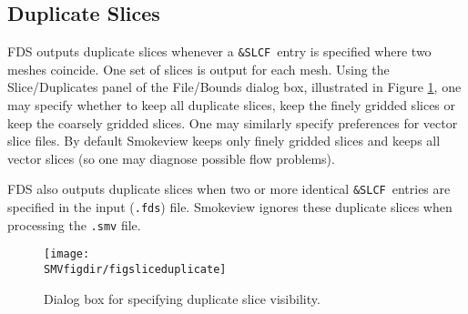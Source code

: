 \documentclass[11pt,twoside]{book}
\begin{document}

\subsection{Duplicate Slices}
FDS outputs duplicate slices whenever a {\tt \&SLCF}\ entry is specified where two meshes coincide.
One set of slices is output for each mesh.
Using the Slice/Duplicates panel of the File/Bounds dialog box, illustrated in Figure \ref{fig:sliceduplicate},
one may specify whether to keep all duplicate slices, keep the finely gridded slices or keep the coarsely gridded slices.
One may similarly specify preferences for vector slice files. By default Smokeview keeps only finely
gridded slices and keeps all vector slices (so one may diagnose possible flow problems).

FDS also outputs duplicate slices when two or more identical {\tt \&SLCF}\ entries are specified in the input ({\tt .fds}) file.  Smokeview ignores these duplicate slices when processing the {\tt .smv} file.

\begin{figure}[bph]
\centerline{
\texttt{[image: \\SMVfigdir/figsliceduplicate]}
}
\caption[Dialog box for specifying duplicate slice visibility.]{Dialog box for specifying duplicate slice visibility.}
\label{fig:sliceduplicate}
\end{figure}


\end{document}
